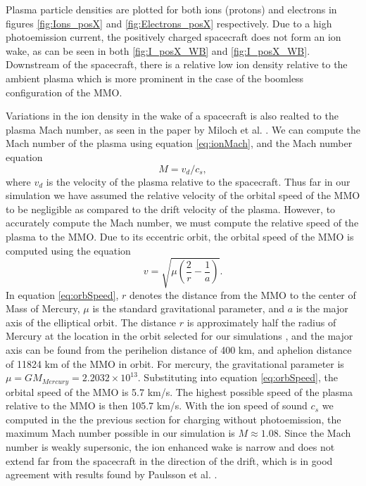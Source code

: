 Plasma particle densities are plotted for both ions (protons) and electrons in figures \ref{fig:Ions_posX} and \ref{fig:Electrons_posX} respectively. Due to a high photoemission current, the positively charged spacecraft does not form an ion wake, as can be seen in both \ref{fig:I_posX_WB} and \ref{fig:I_posX_WB}. Downstream of the spacecraft, there is a relative low ion density relative to the ambient plasma which is more prominent in the case of the boomless configuration of the MMO. 

Variations in the ion density in the wake of a spacecraft is also realted to the plasma Mach number, as seen in the paper by Miloch et al. . We can compute the Mach number of the plasma using equation \eqref{eq:ionMach}, and the Mach number equation
\begin{equation}
    M = v_d / c_s,
\end{equation}
where $v_d$ is the velocity of the plasma relative to the spacecraft. Thus far in our simulation we have assumed the relative velocity of the orbital speed of the MMO to be negligible as compared to the drift velocity of the plasma. However, to accurately compute the Mach number, we must compute the relative speed of the plasma to the MMO. Due to its eccentric orbit, the orbital speed of the MMO is computed using the equation
\begin{equation}\label{eq:orbSpeed}
    v = \sqrt{\mu \left(\frac{2}{r} - \frac{1}{a}\right)}.
\end{equation}
In equation \eqref{eq:orbSpeed}, $r$ denotes the distance from the MMO to the center of Mass of Mercury, $\mu$ is the standard gravitational parameter, and $a$ is the major axis of the elliptical orbit. The distance $r$ is approximately half the radius of Mercury at the location in the orbit selected for our simulations \parencite{Benna2009}, and the major axis can be found from the perihelion distance of 400 km, and aphelion distance of 11824 km of the MMO in orbit. For mercury, the gravitational parameter is $\mu = G M_{Mercury} = 2.2032 \times 10^{13}$. Substituting into equation \eqref{eq:orbSpeed}, the orbital speed of the MMO is 5.7 km/s. The highest possible speed of the plasma relative to the MMO is then 105.7 km/s. With the ion speed of sound $c_s$ we computed in the the previous section for charging without photoemission, the maximum Mach number possible in our simulation is $M \approx 1.08$. Since the Mach number is weakly supersonic, the ion enhanced wake is narrow and does not extend far from the spacecraft in the direction of the drift, which is in good agreement with results found by Paulsson et al. \parencite{Paulsson2019}.   


